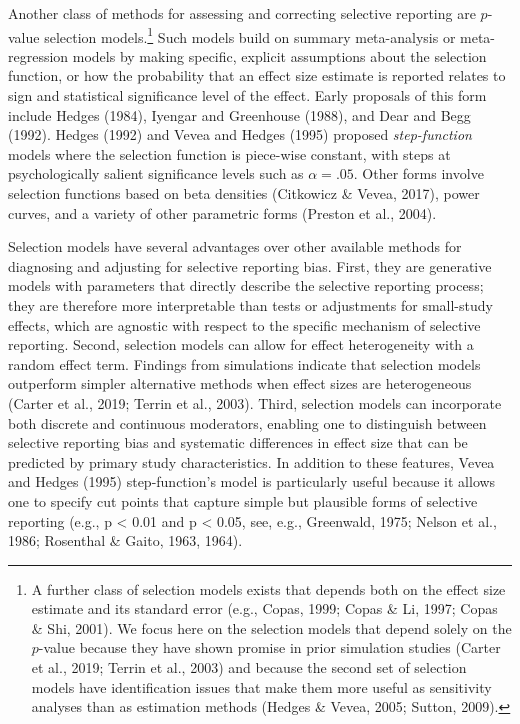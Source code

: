 \documentclass[
  american,
  man, donotrepeattitle,floatsintext]{apa7}
\begin{document}
Another class of methods for assessing and correcting selective reporting are \(p\)-value selection models.\footnote{A further class of selection models exists that depends both on the effect size estimate and its standard error (e.g., Copas, 1999; Copas \& Li, 1997; Copas \& Shi, 2001). We focus here on the selection models that depend solely on the \(p\)-value because they have shown promise in prior simulation studies (Carter et al., 2019; Terrin et al., 2003) and because the second set of selection models have identification issues that make them more useful as sensitivity analyses than as estimation methods (Hedges \& Vevea, 2005; Sutton, 2009).}
Such models build on summary meta-analysis or meta-regression models by making specific, explicit assumptions about the selection function, or how the probability that an effect size estimate is reported relates to sign and statistical significance level of the effect. Early proposals of this form include Hedges (1984), Iyengar and Greenhouse (1988), and Dear and Begg (1992). Hedges (1992) and Vevea and Hedges (1995) proposed \emph{step-function} models where the selection function is piece-wise constant, with steps at psychologically salient significance levels such as \(\alpha = .05\).
Other forms involve selection functions based on beta densities (Citkowicz \& Vevea, 2017), power curves, and a variety of other parametric forms (Preston et al., 2004).

Selection models have several advantages over other available methods for diagnosing and adjusting for selective reporting bias.
First, they are generative models with parameters that directly describe the selective reporting process; they are therefore more interpretable than tests or adjustments for small-study effects, which are agnostic with respect to the specific mechanism of selective reporting.
Second, selection models can allow for effect heterogeneity with a random effect term.
Findings from simulations indicate that selection models outperform simpler alternative methods when effect sizes are heterogeneous (Carter et al., 2019; Terrin et al., 2003).
Third, selection models can incorporate both discrete and continuous moderators, enabling one to distinguish between selective reporting bias and systematic differences in effect size that can be predicted by primary study characteristics.
In addition to these features, Vevea and Hedges (1995) step-function's model is particularly useful because it allows one to specify cut points that capture simple but plausible forms of selective reporting (e.g., p \textless{} 0.01 and p \textless{} 0.05, see, e.g., Greenwald, 1975; Nelson et al., 1986; Rosenthal \& Gaito, 1963, 1964).
\end{document}
